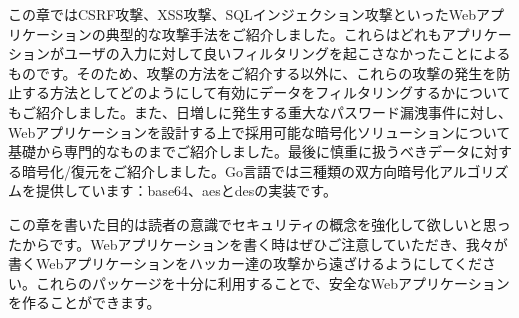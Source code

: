 この章ではCSRF攻撃、XSS攻撃、SQLインジェクション攻撃といったWebアプリケーションの典型的な攻撃手法をご紹介しました。これらはどれもアプリケーションがユーザの入力に対して良いフィルタリングを起こさなかったことによるものです。そのため、攻撃の方法をご紹介する以外に、これらの攻撃の発生を防止する方法としてどのようにして有効にデータをフィルタリングするかについてもご紹介しました。また、日増しに発生する重大なパスワード漏洩事件に対し、Webアプリケーションを設計する上で採用可能な暗号化ソリューションについて基礎から専門的なものまでご紹介しました。最後に慎重に扱うべきデータに対する暗号化/復元をご紹介しました。Go言語では三種類の双方向暗号化アルゴリズムを提供しています：base64、aesとdesの実装です。

この章を書いた目的は読者の意識でセキュリティの概念を強化して欲しいと思ったからです。Webアプリケーションを書く時はぜひご注意していただき、我々が書くWebアプリケーションをハッカー達の攻撃から遠ざけるようにしてください。これらのパッケージを十分に利用することで、安全なWebアプリケーションを作ることができます。
